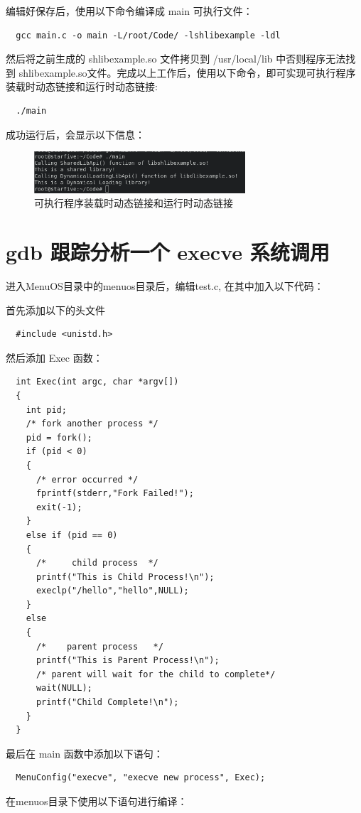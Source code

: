 \documentclass[lang=cn,10pt]{elegantbook}
\begin{document}
编辑好保存后，使用以下命令编译成 main 可执行文件：

\begin{lstlisting}
  gcc main.c -o main -L/root/Code/ -lshlibexample -ldl
\end{lstlisting}

然后将之前生成的 shlibexample.so 文件拷贝到 /usr/local/lib 中否则程序无法找到 shlibexample.so文件。完成以上工作后，使用以下命令，即可实现可执行程序装载时动态链接和运行时动态链接:

\begin{lstlisting}
  ./main	
\end{lstlisting}
成功运行后，会显示以下信息：
\begin{figure}[htbp]
  \centering
  \includegraphics[width=0.7\textwidth]{image/image-20231108220153906.png}
  \caption{可执行程序装载时动态链接和运行时动态链接}
\end{figure}



\section{gdb 跟踪分析一个 execve 系统调用}
进入MenuOS目录中的menuos目录后，编辑test.c, 在其中加入以下代码：

首先添加以下的头文件

\begin{lstlisting}
  #include <unistd.h>
\end{lstlisting}
然后添加 Exec 函数：


\begin{lstlisting}
  int Exec(int argc, char *argv[])
  {
    int pid;
    /* fork another process */
    pid = fork();
    if (pid < 0)
    {
      /* error occurred */
      fprintf(stderr,"Fork Failed!");
      exit(-1);
    }
    else if (pid == 0)
    {
      /*	 child process 	*/
      printf("This is Child Process!\n");
      execlp("/hello","hello",NULL);
    }
    else
    {
      /* 	parent process	 */
      printf("This is Parent Process!\n");
      /* parent will wait for the child to complete*/
      wait(NULL);
      printf("Child Complete!\n");
    }
  }
\end{lstlisting}
最后在 main 函数中添加以下语句：

\begin{lstlisting}
  MenuConfig("execve", "execve new process", Exec);
\end{lstlisting}
在menuos目录下使用以下语句进行编译：
\end{document}
